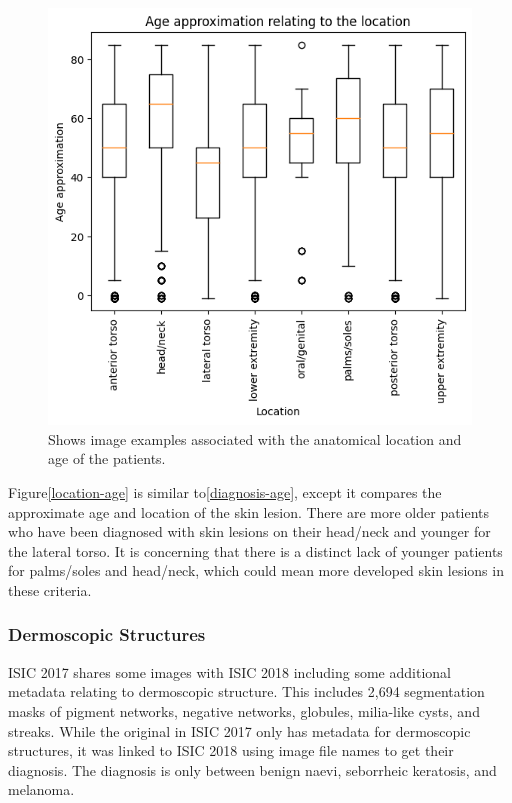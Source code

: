 \begin{figure}
	\centering
	\includegraphics[scale=0.75]{images/ISIC/location-age.png}
	\caption{Shows image examples associated with the anatomical location and age of the patients.}
\end{figure}\label{location-age}

Figure\ref{location-age} is similar to\ref{diagnosis-age}, except it compares the approximate age and location of the skin lesion. There are more older patients who have been diagnosed with skin lesions on their head/neck and younger for the lateral torso. It is concerning that there is a distinct lack of younger patients for palms/soles and head/neck, which could mean more developed skin lesions in these criteria.

\subsubsection{Dermoscopic Structures}
ISIC 2017 shares some images with ISIC 2018 including some additional metadata relating to dermoscopic structure. This includes 2,694 segmentation masks of pigment networks, negative networks, globules, milia-like cysts, and streaks. While the original in ISIC 2017 only has metadata for dermoscopic structures, it was linked to ISIC 2018 using image file names to get their diagnosis. The diagnosis is only between benign naevi, seborrheic keratosis, and melanoma.

